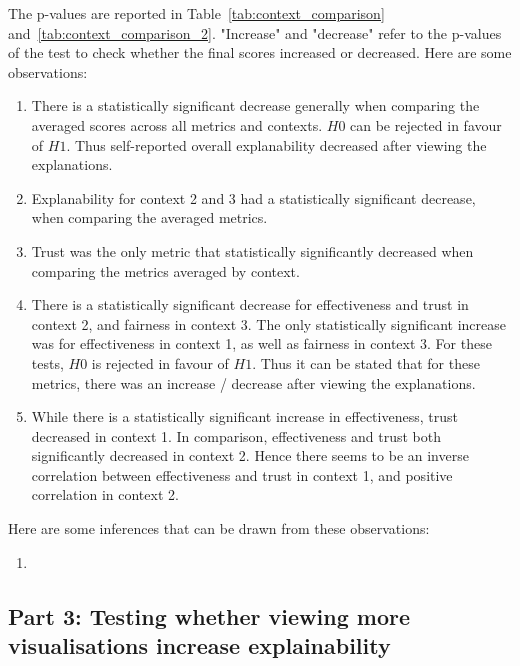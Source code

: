 The p-values are reported in Table~\ref{tab:context_comparison} and~\ref{tab:context_comparison_2}. "Increase" and "decrease" refer to the p-values of the test to check whether the final scores increased or decreased. Here are some observations:
\begin{enumerate}
    \item There is a statistically significant decrease generally when comparing the averaged scores across all metrics and contexts. $H0$ can be rejected in favour of $H1$. Thus self-reported overall explanability decreased after viewing the explanations.
    \item Explanability for context 2 and 3 had a statistically significant decrease, when comparing the averaged metrics.
    \item Trust was the only metric that statistically significantly decreased when comparing the metrics averaged by context.
    \item There is a statistically significant decrease for effectiveness and trust in context 2, and fairness in context 3. The only statistically significant increase was for effectiveness in context 1, as well as fairness in context 3. For these tests, $H0$ is rejected in favour of $H1$. Thus it can be stated that for these metrics, there was an increase / decrease after viewing the explanations.
    \item While there is a statistically significant increase in effectiveness, trust decreased in context 1. In comparison, effectiveness and trust both significantly decreased in context 2. Hence there seems to be an inverse correlation between effectiveness and trust in context 1, and positive correlation in context 2.
\end{enumerate}

Here are some inferences that can be drawn from these observations:
\begin{enumerate}
    \item 
\end{enumerate}

\subsection{Part 3: Testing whether viewing more visualisations increase explainability}

